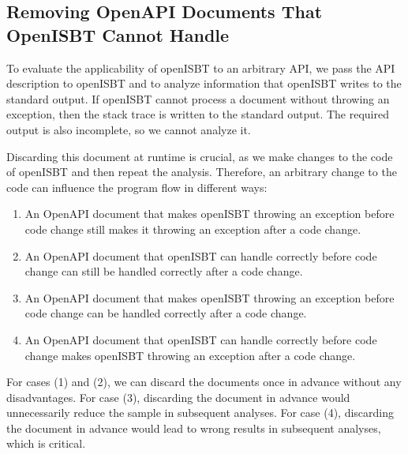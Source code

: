 \subsection{Removing OpenAPI Documents That OpenISBT Cannot Handle}
\label{sec:remove_files_where_exception_is_thrown}
To evaluate the applicability of openISBT to an arbitrary API, we pass the API description to openISBT and to analyze information that openISBT writes to the standard output. If openISBT cannot process a document without throwing an exception, then the stack trace is written to the standard output. The required output is also incomplete, so we cannot analyze it.

Discarding this document at runtime is crucial, as we make changes to the code of openISBT and then repeat the analysis. Therefore, an arbitrary change to the code can influence the program flow in different ways:
\begin{enumerate}
    \item An OpenAPI document that makes openISBT throwing an exception before code change still makes it throwing an exception after a code change.  
    \item An OpenAPI document that openISBT can handle correctly before code change can still be handled correctly after a code change.  
    \item An OpenAPI document that makes openISBT throwing an exception before code change can be handled correctly after a code change. 
    \item An OpenAPI document that openISBT can handle correctly before code change makes openISBT throwing an exception after a code change.   
\end{enumerate}
For cases (1) and (2), we can discard the documents once in advance without any disadvantages. For case (3), discarding the document in advance would unnecessarily reduce the sample in subsequent analyses.
For case (4), discarding the document in advance would lead to wrong results in subsequent analyses, which is critical. 